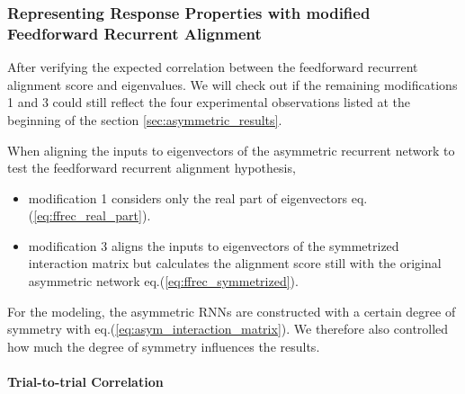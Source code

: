 \documentclass[11pt]{article}
\begin{document}
	\subsubsection{Representing Response Properties with modified Feedforward Recurrent Alignment} \label{sec:asym_ffrec_response}
	
	After verifying the expected correlation between the feedforward recurrent alignment score and eigenvalues. We will check out if the remaining modifications 1 and 3 could still reflect the four experimental observations listed at the beginning of the section \ref{sec:asymmetric_results}. 
	
	When aligning the inputs to eigenvectors of the asymmetric recurrent network to test the feedforward recurrent alignment hypothesis,
	\begin{itemize}
		\item modification 1 considers only the real part of eigenvectors eq.(\ref{eq:ffrec_real_part}). 
		\item modification 3 aligns the inputs to eigenvectors of the symmetrized interaction matrix but calculates the alignment score still with the original asymmetric network eq.(\ref{eq:ffrec_symmetrized}). 
	\end{itemize}
	
	For the modeling, the asymmetric RNNs are constructed with a certain degree of symmetry with eq.(\ref{eq:asym_interaction_matrix}). We therefore also controlled how much the degree of symmetry influences the results. 
	
	\paragraph{Trial-to-trial Correlation}
	
\end{document}
